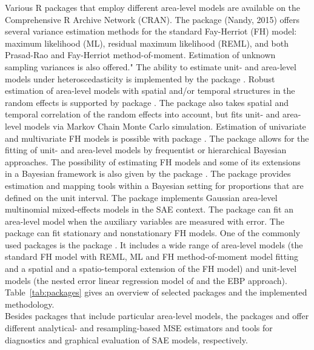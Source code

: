 Various R packages that employ different area-level models are
available on the Comprehensive R Archive Network (CRAN). The package  (Nandy, 2015) offers several variance estimation methods for the standard Fay-Herriot (FH) model:  maximum likelihood (ML), residual maximum likelihood (REML), and both Prasad-Rao and Fay-Herriot method-of-moment. Estimation of unknown sampling variances is also offered."
The ability to estimate unit- and area-level models under heteroscedasticity is implemented by the 
package \citep{Breidenbach2015}. Robust estimation
of area-level models with spatial and/or temporal structures in the random effects
is supported by package  \citep{Warnholz2018}. The  package \citep{Boonstra2021} also takes spatial and temporal correlation of the random effects into account, but fits unit- and area-level models via Markov Chain Monte Carlo simulation. Estimation of
univariate and multivariate FH models is possible with package  \citep{Permatasari2020}.
The package  \citep{Boonstra2012} allows for the fitting of unit- and
area-level models by frequentist or hierarchical Bayesian approaches. The
possibility of estimating FH models and some of its extensions in a Bayesian
framework is also given by the  package \citep{Chengchun2018}. The  package \citep{Nicolo2022} provides estimation and mapping tools within a Bayesian setting for proportions that are defined on the unit interval. The  package \citep{Lopez2019} implements
Gaussian area-level multinomial mixed-effects models in the SAE context. The  package \citep{Mubarak2020} can fit an area-level model when the auxiliary variables are measured with error. The  package \citep{Chandra2022} can fit stationary and nonstationary FH models.
One of the commonly used packages is the  package \citep{Molina2015}. It
includes a wide range of area-level models (the standard FH model with REML, ML
and FH method-of-moment model fitting and a spatial and a spatio-temporal
extension of the FH model) and unit-level models (the nested error linear
regression model of \citet{Battese1988} and the EBP approach). Table~\ref{tab:packages}
gives an overview of selected packages and the implemented methodology.\\
Besides packages that include particular area-level models, the packages  \citep{Xiao2022} and  \citep{Fasulo2022}  offer different analytical- and resampling-based MSE estimators and tools for diagnostics and graphical evaluation of SAE models, respectively.

